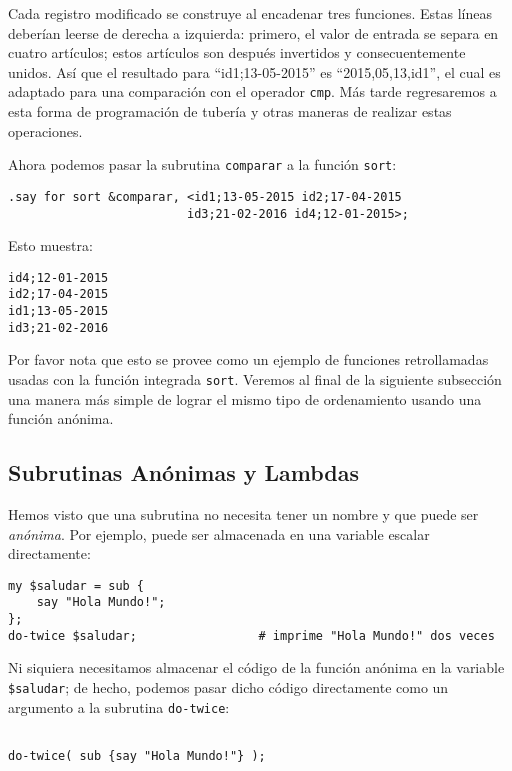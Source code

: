 Cada registro modificado se construye al encadenar tres funciones.
Estas líneas deberían leerse de derecha a izquierda: primero, 
el valor de entrada se separa en cuatro artículos; estos artículos
son después invertidos y consecuentemente unidos. Así que el resultado
para ``id1;13-05-2015'' es ``2015,05,13,id1'', el cual es adaptado
para una comparación con el operador {\tt cmp}. Más tarde regresaremos
a esta forma de programación de tubería y otras maneras de realizar 
estas operaciones. 

Ahora podemos pasar la subrutina {\tt comparar} a la función
{\tt sort}:
\begin{verbatim}
.say for sort &comparar, <id1;13-05-2015 id2;17-04-2015 
                         id3;21-02-2016 id4;12-01-2015>;
\end{verbatim}

Esto muestra:
\begin{verbatim}
id4;12-01-2015
id2;17-04-2015
id1;13-05-2015
id3;21-02-2016
\end{verbatim}

Por favor nota que esto se provee como un ejemplo de funciones 
retrollamadas usadas con la función integrada {\tt sort}.
Veremos al final de la siguiente subsección una manera más simple
de lograr el mismo tipo de ordenamiento usando una función 
anónima.

\subsection{Subrutinas Anónimas y Lambdas}

Hemos visto que una subrutina no necesita tener un nombre
y que puede ser \emph{anónima}. Por ejemplo, puede ser almacenada
en una variable escalar directamente:

\begin{verbatim}
my $saludar = sub {
    say "Hola Mundo!";
};
do-twice $saludar;                 # imprime "Hola Mundo!" dos veces
\end{verbatim}

Ni siquiera necesitamos almacenar el código de la función
anónima en la variable \verb|$saludar|; de hecho, podemos
pasar dicho código directamente como un argumento a la 
subrutina {\tt do-twice}:

\begin{verbatim}

do-twice( sub {say "Hola Mundo!"} );
\end{verbatim}

